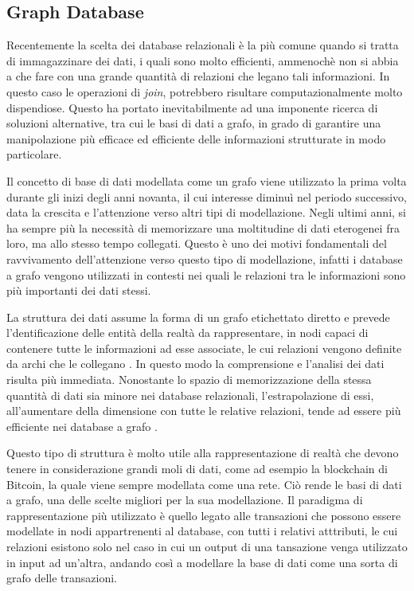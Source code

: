 \subsection{Graph Database}
 Recentemente la scelta dei database relazionali è la più comune quando si tratta di immagazzinare dei dati, i quali sono molto efficienti, ammenochè non si abbia a che fare con una grande quantità di relazioni che legano tali informazioni.
 In questo caso le operazioni di \emph{join}, potrebbero risultare computazionalmente molto dispendiose.
 Questo ha portato inevitabilmente ad una imponente ricerca di soluzioni alternative, tra cui le basi di dati a grafo, in grado di garantire una manipolazione più efficace ed efficiente delle informazioni strutturate in modo particolare.
 
Il concetto di base di dati \cite{GraphDatabase-Survey} modellata come un grafo viene utilizzato la prima volta durante gli inizi degli anni novanta, il cui interesse diminuì nel periodo successivo, data la crescita e l'attenzione verso altri tipi di modellazione.
Negli ultimi anni, si ha sempre più la necessità di memorizzare una moltitudine di dati eterogenei fra loro, ma allo stesso tempo collegati.
Questo è uno dei motivi fondamentali del ravvivamento dell'attenzione verso questo tipo di modellazione,
infatti i  database a grafo vengono utilizzati in contesti nei quali le relazioni tra le informazioni sono più importanti dei dati stessi.

La struttura dei dati assume la forma di un grafo etichettato diretto 
 e prevede l'dentificazione delle entità della realtà da rappresentare,  in nodi capaci di contenere tutte le informazioni ad esse associate, le cui relazioni vengono definite da archi che le collegano   \cite{Graph-modelling-1990}.
 In questo modo la comprensione e l'analisi dei dati risulta più immediata. Nonostante lo spazio di  memorizzazione della stessa quantità di dati sia minore nei database relazionali, l'estrapolazione di essi, all'aumentare della dimensione con tutte le relative relazioni, tende ad essere  più efficiente nei database a grafo \cite{Graph-comparison-relational}.
 
 Questo tipo di struttura è molto utile alla rappresentazione di realtà che devono tenere in considerazione grandi moli di dati, come ad esempio la blockchain di Bitcoin, la quale viene sempre modellata come una rete. Ciò rende le basi di dati a grafo, una delle scelte migliori per la sua modellazione.
 Il paradigma di rappresentazione più utilizzato è quello legato alle transazioni che possono essere modellate in nodi appartrenenti al database, con tutti i relativi atttributi, le cui relazioni esistono solo nel caso in cui un output di una tansazione venga utilizzato in input ad un'altra, andando così a modellare la base di dati come una sorta di grafo delle transazioni.
 \thispagestyle{mystyle}







